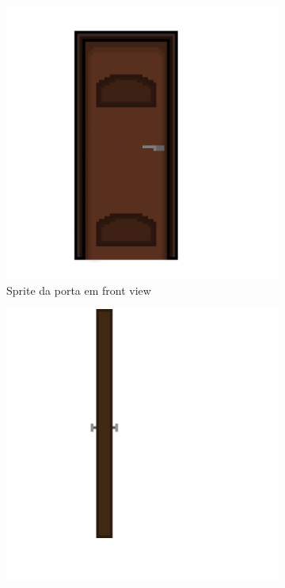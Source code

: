 \begin{figure}[htbp]
\begin{subfigure}{0.23\linewidth}
        \label{fig:geminiProPabloPixelLab45_2}
    \end{subfigure}
    \begin{subfigure}{0.23\linewidth}
        \centering
        \includegraphics[width=1\linewidth]{figs/vidu/referencia_porta (1).png}
        \caption{\small Sprite da porta em front view}
        \label{fig:geminiProPortaA}
    \end{subfigure}
    \begin{subfigure}{0.23\linewidth}
        \centering
        \includegraphics[width=1\linewidth]{figs/vidu/referencia_porta (2).png}

\end{subfigure}
\end{figure}
